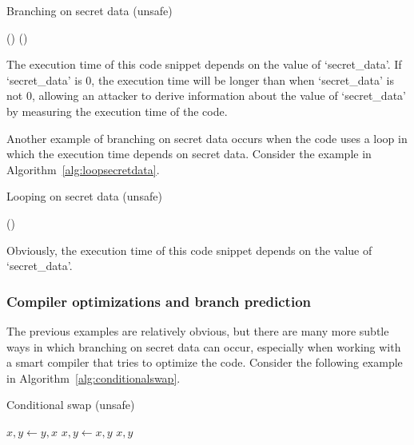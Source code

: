 \documentclass[11pt,a4paper]{report}
\theoremstyle{definition}
\begin{document}
\begin{algorithm}
  \caption{Branching on secret data (unsafe)}
  \label{alg:branchingsecretdata}
  \begin{algorithmic}[1]
    \State {}() 
    \Else
    \State {}() 
    \EndIf
  \end{algorithmic}
\end{algorithm}

The execution time of this code snippet depends on the value of `secret\_data'. If `secret\_data' is 0, the execution time will be longer than when `secret\_data' is not 0, allowing an attacker to derive information about the value of `secret\_data' by measuring the execution time of the code.

Another example of branching on secret data occurs when the code uses a loop in which the execution time depends on secret data. Consider the example in Algorithm~\ref{alg:loopsecretdata}.

\begin{algorithm}
  \caption{Looping on secret data (unsafe)}
  \label{alg:loopsecretdata}
  \begin{algorithmic}[1]
    \State {}()
    \EndFor
  \end{algorithmic}
\end{algorithm}

Obviously, the execution time of this code snippet depends on the value of `secret\_data'.

\subsubsection{Compiler optimizations and branch prediction}
The previous examples are relatively obvious, but there are many more subtle ways in which branching on secret data can occur, especially when working with a smart compiler that tries to optimize the code. Consider the following example in Algorithm~\ref{alg:conditionalswap}.

\begin{algorithm}
  \caption{Conditional swap (unsafe)}
  \label{alg:conditionalswap}
  \begin{algorithmic}[1]
    \State $x, y \gets y, x$
    \Else
    \State $x, y \gets x, y$
    \EndIf
    \State \Return $x, y$
    \EndFunction
  \end{algorithmic}
\end{algorithm}
\end{document}
